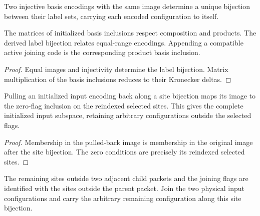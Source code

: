 \begin{definition}
    \label{def:mpu_basis_encoding_coordinates}
    \leanok
    Two injective basis encodings with the same image determine a unique bijection
    between their label sets, carrying each encoded configuration to itself.
\end{definition}

\begin{lemma}
    \label{thm:mpu_basis_encoding_coordinates}
    \leanok
    The matrices of initialized basis inclusions respect composition and products.
    The derived label bijection relates equal-range encodings. Appending
    a compatible active joining code is the corresponding product basis inclusion.
\end{lemma}
\begin{proof}\leanok
    Equal images and injectivity determine the label bijection. Matrix
    multiplication of the basis inclusions reduces to their Kronecker deltas.
\end{proof}

\begin{lemma}
    \label{thm:mpu_initialized_encoding_coordinates}
    \leanok
    Pulling an initialized input encoding back along a site bijection maps
    its image to the zero-flag inclusion on the reindexed selected sites.
    This gives the complete initialized input subspace, retaining arbitrary
    configurations outside the selected flags.
\end{lemma}
\begin{proof}\leanok
    Membership in the pulled-back image is membership in the original image
    after the site bijection. The zero conditions are precisely its reindexed
    selected sites.
\end{proof}

\begin{definition}
    \label{def:mpu_actual_input_regrouping}
    \leanok
    The remaining sites outside two adjacent child packets and the joining flags
    are identified with the sites outside the parent packet. Join the two physical
    input configurations and carry the arbitrary remaining configuration along
    this site bijection.
\end{definition}

